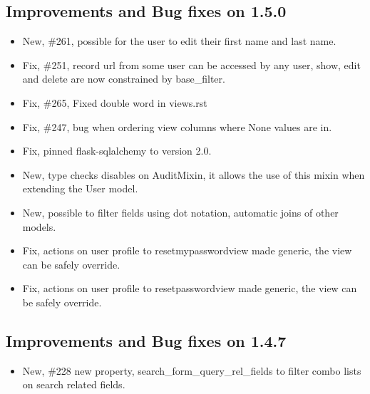 \documentclass[letterpaper,10pt,english]{sphinxmanual}
\begin{document}
\subsection{Improvements and Bug fixes on 1.5.0}
\label{versions:improvements-and-bug-fixes-on-1-5-0}\begin{itemize}
\item {} 
New, \#261, possible for the user to edit their first name and last name.

\item {} 
Fix, \#251, record url from some user can be accessed by any user, show, edit and delete are now constrained by base\_filter.

\item {} 
Fix, \#265, Fixed double word in views.rst

\item {} 
Fix, \#247, bug when ordering view columns where None values are in.

\item {} 
Fix, pinned flask-sqlalchemy to version 2.0.

\item {} 
New, type checks disables on AuditMixin, it allows the use of this mixin when extending the User model.

\item {} 
New, possible to filter fields using dot notation, automatic joins of other models.

\item {} 
Fix, actions on user profile to resetmypasswordview made generic, the view can be safely override.

\item {} 
Fix, actions on user profile to resetpasswordview made generic, the view can be safely override.

\end{itemize}


\subsection{Improvements and Bug fixes on 1.4.7}
\label{versions:improvements-and-bug-fixes-on-1-4-7}\begin{itemize}
\item {} 
New, \#228 new property, search\_form\_query\_rel\_fields to filter combo lists on search related fields.

\end{itemize}
\end{document}

